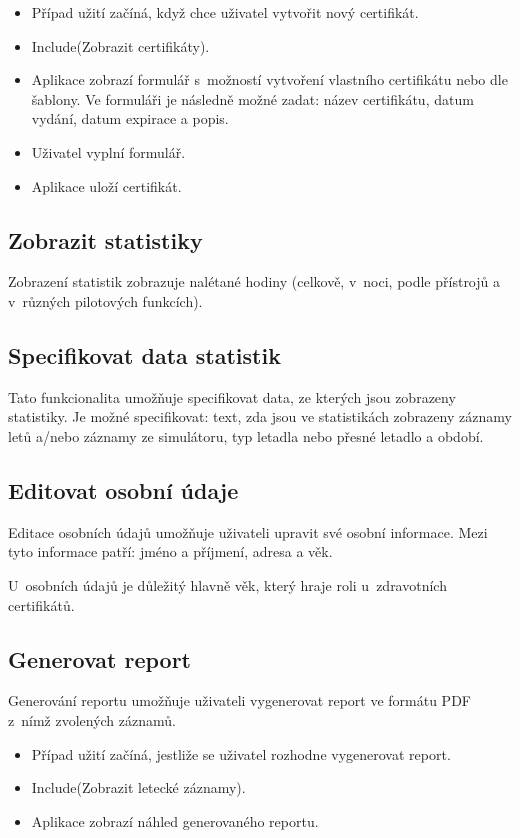 \documentclass[thesis=M,czech]{FITthesis}[2012/06/26]
\begin{document}
\begin{itemize}
\item Případ užití začíná, když chce uživatel vytvořit nový certifikát.
\item Include(Zobrazit certifikáty).
\item Aplikace zobrazí formulář s~možností vytvoření vlastního certifikátu nebo dle šablony. Ve formuláři je následně možné zadat: název certifikátu, datum vydání, datum expirace a popis.
\item Uživatel vyplní formulář.
\item Aplikace uloží certifikát.
\end{itemize}

\subsection{Zobrazit statistiky}
Zobrazení statistik zobrazuje nalétané hodiny (celkově, v~noci, podle přístrojů a v~různých pilotových funkcích).

\subsection{Specifikovat data statistik}
Tato funkcionalita umožňuje specifikovat data, ze kterých jsou zobrazeny statistiky.
Je možné specifikovat: text, zda jsou ve statistikách zobrazeny záznamy letů a/nebo záznamy ze simulátoru, typ letadla nebo přesné letadlo a období.

\subsection{Editovat osobní údaje}
Editace osobních údajů umožňuje uživateli upravit své osobní informace. Mezi tyto informace patří: jméno a příjmení, adresa a věk.

U~osobních údajů je důležitý hlavně věk, který hraje roli u~zdravotních certifikátů.

\subsection{Generovat report}
Generování reportu umožňuje uživateli vygenerovat report ve formátu PDF z~nímž zvolených záznamů.

\begin{itemize}
\item Případ užití začíná, jestliže se uživatel rozhodne vygenerovat report.
\item Include(Zobrazit letecké záznamy).
\item Aplikace zobrazí náhled generovaného reportu.
\end{itemize}
\end{document}
